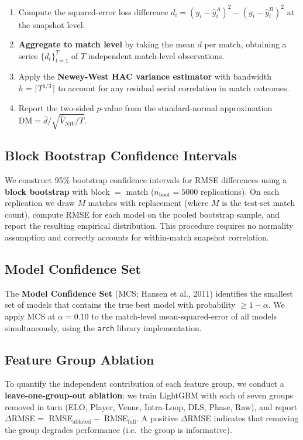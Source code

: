 \documentclass[12pt,a4paper,oneside]{report}
\begin{document}
\begin{enumerate}[nosep]
    \item Compute the squared-error loss difference $d_i = (y_i - \hat{y}^A_i)^2 - (y_i - \hat{y}^B_i)^2$ at the snapshot level.
    \item \textbf{Aggregate to match level} by taking the mean $d$ per match, obtaining a series $\{d_t\}_{t=1}^T$ of $T$ independent match-level observations.
    \item Apply the \textbf{Newey-West HAC variance estimator} \citep{newey1987simple} with bandwidth $h = \lceil T^{1/3} \rceil$ to account for any residual serial correlation in match outcomes.
    \item Report the two-sided $p$-value from the standard-normal approximation $\text{DM} = \bar{d} / \sqrt{\hat{V}_{NW}/T}$.
\end{enumerate}

\subsection{Block Bootstrap Confidence Intervals}

We construct 95\% bootstrap confidence intervals for RMSE differences using a \textbf{block bootstrap} with block $=$ match ($n_{\text{boot}} = 5000$ replications).  On each replication we draw $M$ matches with replacement (where $M$ is the test-set match count), compute RMSE for each model on the pooled bootstrap sample, and report the resulting empirical distribution.  This procedure requires no normality assumption and correctly accounts for within-match snapshot correlation.

\subsection{Model Confidence Set}

The \textbf{Model Confidence Set} (MCS; Hansen et al., 2011) \citep{hansen2011model} identifies the smallest set of models that contains the true best model with probability $\ge 1 - \alpha$.  We apply MCS at $\alpha = 0.10$ to the match-level mean-squared-error of all models simultaneously, using the \texttt{arch} library implementation.

\subsection{Feature Group Ablation}

To quantify the independent contribution of each feature group, we conduct a \textbf{leave-one-group-out ablation}: we train LightGBM with each of seven groups removed in turn (ELO, Player, Venue, Intra-Loop, DLS, Phase, Raw), and report $\Delta$RMSE$=$ RMSE$_{\text{ablated}} -$ RMSE$_{\text{full}}$.  A positive $\Delta$RMSE indicates that removing the group degrades performance (i.e.\ the group is informative).
\end{document}
